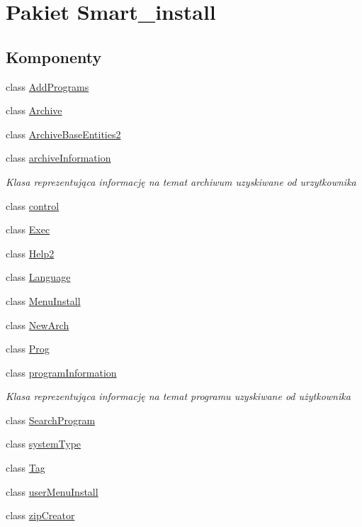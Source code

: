 \hypertarget{namespace_smart__install}{\section{Pakiet Smart\+\_\+install}
\label{namespace_smart__install}
}
\subsection*{Komponenty}
\begin{DoxyCompactItemize}
\item 
class \hyperlink{class_smart__install_1_1_add_programs}{Add\+Programs}
\item 
class \hyperlink{class_smart__install_1_1_archive}{Archive}
\item 
class \hyperlink{class_smart__install_1_1_archive_base_entities2}{Archive\+Base\+Entities2}
\item 
class \hyperlink{class_smart__install_1_1archive_information}{archive\+Information}
\begin{DoxyCompactList}\small\item\em Klasa reprezentująca informację na temat archiwum uzyskiwane od urzytkownika \end{DoxyCompactList}\item 
class \hyperlink{class_smart__install_1_1control}{control}
\item 
class \hyperlink{class_smart__install_1_1_exec}{Exec}
\item 
class \hyperlink{class_smart__install_1_1_help2}{Help2}
\item 
class \hyperlink{class_smart__install_1_1_language}{Language}
\item 
class \hyperlink{class_smart__install_1_1_menu_install}{Menu\+Install}
\item 
class \hyperlink{class_smart__install_1_1_new_arch}{New\+Arch}
\item 
class \hyperlink{class_smart__install_1_1_prog}{Prog}
\item 
class \hyperlink{class_smart__install_1_1program_information}{program\+Information}
\begin{DoxyCompactList}\small\item\em Klasa reprezentująca informację na temat programu uzyskiwane od użytkownika \end{DoxyCompactList}\item 
class \hyperlink{class_smart__install_1_1_search_program}{Search\+Program}
\item 
class \hyperlink{class_smart__install_1_1system_type}{system\+Type}
\item 
class \hyperlink{class_smart__install_1_1_tag}{Tag}
\item 
class \hyperlink{class_smart__install_1_1user_menu_install}{user\+Menu\+Install}
\item 
class \hyperlink{class_smart__install_1_1zip_creator}{zip\+Creator}
\end{DoxyCompactItemize}
